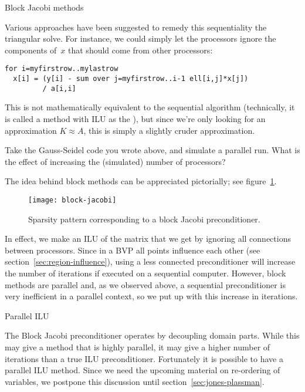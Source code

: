  {Block Jacobi methods}
\label{sec:block-jacobi}

Various approaches have been suggested to remedy this sequentiality
the triangular solve. For instance, we could simply let the processors
ignore the components of~$x$ that should come from other processors:
\begin{verbatim}
for i=myfirstrow..mylastrow
  x[i] = (y[i] - sum over j=myfirstrow..i-1 ell[i,j]*x[j]) 
         / a[i,i]
\end{verbatim}
This is not mathematically equivalent to the sequential algorithm
(technically, it is called a  method with 
\ac{ILU} as the ), but
since we're only looking for an approximation $K\approx A$, this is
simply a slightly cruder approximation.
\begin{exercise}
  Take the Gauss-Seidel code you wrote above, and simulate a parallel
  run. What is the effect of increasing the (simulated) number of processors?
\end{exercise}

The idea behind block methods can be appreciated pictorially;
see figure~\ref{fig:block-method}.
\begin{figure}[ht]
  \texttt{[image: block-jacobi]}
  \caption{Sparsity pattern corresponding to a block Jacobi
    preconditioner.}
  \label{fig:block-method}
\end{figure}
In effect, we make an \ac{ILU} of the matrix that we get by ignoring
all connections between processors. Since in a \ac{BVP} all points
influence each other (see section~\ref{sec:region-influence}), using a
less connected preconditioner will increase the number of iterations
if executed on a sequential computer. However, block methods are
parallel and, as we observed above, a sequential preconditioner is
very inefficient in a parallel context, so we put up with this
increase in iterations.


 {Parallel ILU}
\label{sec:parallel-ilu}

The Block Jacobi preconditioner operates by decoupling domain
parts. While this may give a method that is highly parallel, it may
give a higher number of iterations than a true \ac{ILU}
preconditioner.
Fortunately it is possible to
have a parallel \ac{ILU} method. Since we need the upcoming
material on re-ordering of variables, we postpone this discussion
until section~\ref{sec:jones-plassman}.


